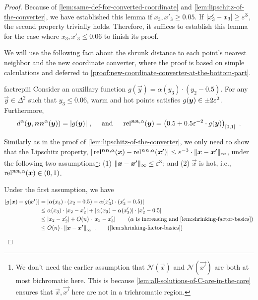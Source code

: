 \begin{proof}
    Because of \cref{lem:same-def-for-converted-coordinate} and \cref{lem:lipschitz-of-the-converter}, we have established this lemma if $x_3,x'_3\geq 0.05$.
    If $|x'_3-x_3|\geq \varepsilon^3$, the second property trivially holds. 
    Therefore, it suffices to establish this lemma for the case where $x_3,x'_3\leq 0.06$ to finish its proof.

    We will use the following fact about the shrunk distance to each point's nearest neighbor and the new coordinate converter, where the proof is based on simple calculations and deferred to \cref{proof:new-coordinate-converter-at-the-bottom-part}.
    \begin{restatable}[]{fact}{repiii}
        \label{fact:new-coordinate-converter-at-the-bottom-part}
        Consider an auxillary function $g(\vec{y}) = \alpha(y_3) \cdot (y_2-0.5)$.
        For any $\vec{y}\in \Delta^2$ such that $y_3\leq 0.06$, warm and hot points satisfies $g(\boldsymbol{y})\in \pm 2\varepsilon^2$. Furthermore, 
        \begin{align*}
            d^\alpha(\boldsymbol{y}, \operatorname*{\boldsymbol{nn}^{\alpha}}(\boldsymbol{y})) = |g(\boldsymbol{y})|~, \quad \text{ and } \quad 
            \operatorname*{rel^{\boldsymbol{nn},\alpha}}(\boldsymbol{y}) = \left(0.5 + 0.5\varepsilon^{-2} \cdot g(\boldsymbol{y}) \right)_{[0,1]}~.
        \end{align*}
    \end{restatable}

    Similarly as in the proof of \cref{lem:lipschitz-of-the-converter}, we only need to show that the Lipschitz property, $|\operatorname*{rel^{\boldsymbol{nn},\alpha}}(\boldsymbol{x})-\operatorname*{rel^{\boldsymbol{nn},\alpha}}(\boldsymbol{x'})|\leq \varepsilon^{-3}\cdot \| {\boldsymbol{x}-\boldsymbol{x'}} \|_{\infty}$, under the following two assumptions\footnote{We don't need the earlier assumption that $\mathcal{N}(\vec{x})$ and $\mathcal{N}(\vec{x'})$ are both at most bichromatic here. This is because \cref{lem:all-solutions-of-C-are-in-the-core} ensures that $\vec{x}, \vec{x'}$ here are not in a trichromatic region.}: 
    (1) $\| {\boldsymbol{x}-\boldsymbol{x'}} \|_{\infty} \leq \varepsilon^3$; and 
    (2) $\vec{x}$ is hot, i.e., $\operatorname*{rel^{\boldsymbol{nn},\alpha}}(\boldsymbol{x})\in (0,1)$.

    Under the first assumption, we have 
    \begin{align*}
        |g(\vec{x}) - g(\vec{x'})| &= \abs{\alpha(x_3)\cdot (x_2-0.5) - \alpha(x'_3)\cdot (x'_2-0.5)}\\
        &\leq \alpha(x_3) \cdot \abs{x_2-x'_2} + \abs{\alpha(x_3)-\alpha(x'_3)} \cdot |x'_2-0.5| \\
        &\leq \abs{x_2-x'_2} + O(n)\cdot \abs{x_3-x'_3} 
        \tag{$\alpha$ is increasing and \cref{lem:shrinking-factor-basics}}
        \\
        &\leq O(n)\cdot \norm{\vec{x}-\vec{x'}}\infty~.\tag{\cref{lem:shrinking-factor-basics}}
    \end{align*}


\end{proof}
